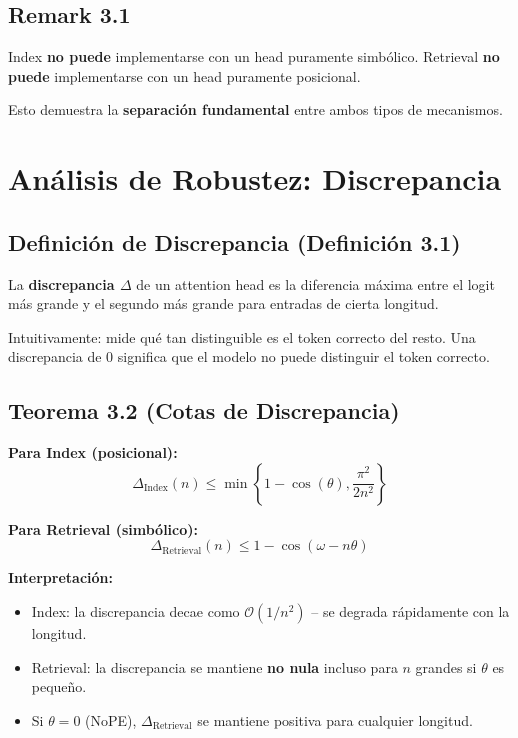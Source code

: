 \documentclass[conference]{IEEEtran}
\begin{document}
\subsection{Remark 3.1}

Index \textbf{no puede} implementarse con un head puramente simb\'olico.
Retrieval \textbf{no puede} implementarse con un head puramente posicional.

Esto demuestra la \textbf{separaci\'on fundamental} entre ambos tipos de mecanismos.

\section{An\'alisis de Robustez: Discrepancia}

\subsection{Definici\'on de Discrepancia (Definici\'on 3.1)}

La \textbf{discrepancia $\Delta$} de un attention head es la diferencia m\'axima entre el logit m\'as grande y el segundo m\'as grande para entradas de cierta longitud.

Intuitivamente: mide qu\'e tan distinguible es el token correcto del resto. Una discrepancia de 0 significa que el modelo no puede distinguir el token correcto.

\subsection{Teorema 3.2 (Cotas de Discrepancia)}

\textbf{Para Index (posicional):}
\[
\Delta_{\text{Index}}(n) \leq \min\left\{1 - \cos(\theta), \frac{\pi^2}{2n^2}\right\}
\]

\textbf{Para Retrieval (simb\'olico):}
\[
\Delta_{\text{Retrieval}}(n) \leq 1 - \cos(\omega - n\theta)
\]

\textbf{Interpretaci\'on:}
\begin{itemize}
    \item Index: la discrepancia decae como $\mathcal{O}(1/n^2)$ -- se degrada r\'apidamente con la longitud.
    \item Retrieval: la discrepancia se mantiene \textbf{no nula} incluso para $n$ grandes si $\theta$ es peque\~no.
    \item Si $\theta = 0$ (NoPE), $\Delta_{\text{Retrieval}}$ se mantiene positiva para cualquier longitud.
\end{itemize}
\end{document}
